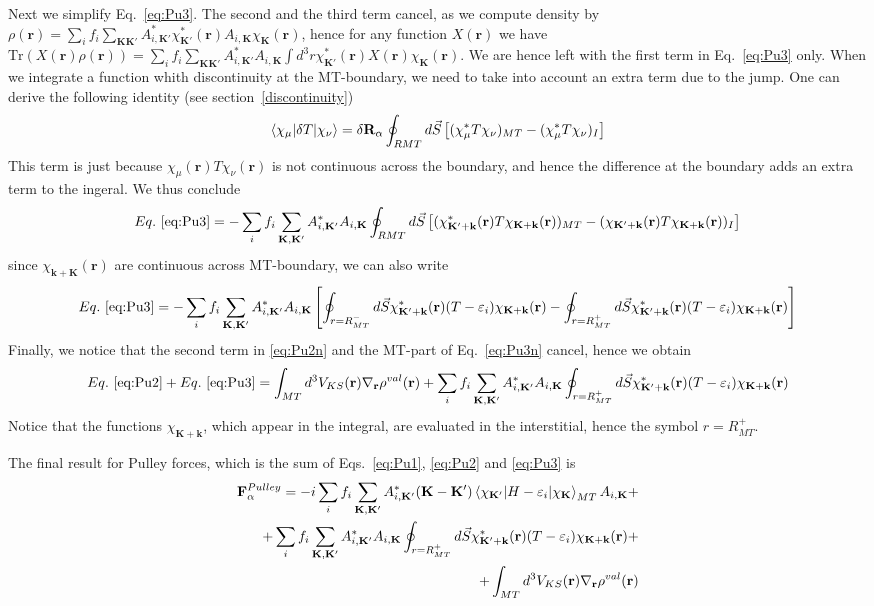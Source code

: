 \documentclass[aps,prb,floatfix,epsfig,singlecolumn,showpacs,preprintnumbers]{revtex4}
\newcommand{\vR}{{\mathbf{R}}}
\newcommand{\vF}{{\mathbf{F}}}
\renewcommand{\vr}{{\mathbf{r}}}
\newcommand{\vk}{{\mathbf{k}}}
\newcommand{\vK}{{\mathbf{K}}}
\newcommand{\Tr}{\mathrm{Tr}}
\begin{document}
Next we simplify Eq.~\ref{eq:Pu3}. The second and the third term
cancel, as we compute density by
$\rho(\vr)=\sum_i f_i \sum_{\vK\vK'}A_{i,\vK'}^* \chi^*_{\vK'}(\vr)
A_{i,\vK} \chi_{\vK}(\vr)$, hence for any function $X(\vr)$ we have
$\Tr(X(\vr)\rho(\vr))=\sum_i f_i \sum_{\vK\vK'}A_{i,\vK'}^* A_{i,\vK}
\int d^3r \chi^*_{\vK'}(\vr) X(\vr)\chi_{\vK}(\vr) $.
%
We are hence left with the first term in Eq.~\ref{eq:Pu3} only.
When we integrate a function whith discontinuity at the
MT-boundary, we need to take into account an extra term due to the
jump. One can derive the following identity (see section~\ref{discontinuity})
\begin{eqnarray}
\braket{\chi_\mu|\delta T|\chi_\nu}=\delta\vR_\alpha \oint_{RMT}
  d\vec{S}\left[ (\chi_\mu^* T \chi_\nu)_{MT} -(\chi_\mu^* T \chi_\nu)_I \right]
\end{eqnarray}
This term is just because $\chi_\mu(\vr)T\chi_\nu(\vr)$ is not continuous across the boundary,
and hence the difference at the boundary adds an extra term to the
ingeral. We thus conclude
\begin{eqnarray}
Eq.~\ref{eq:Pu3}=-\sum_i f_i \sum_{\vK,\vK'} A_{i,\vK'}^*A_{i,\vK}   
\oint_{RMT}d\vec{S} 
\left[
(\chi^*_{\vK'+\vk}(\vr) T  \chi_{\vK+\vk}(\vr))_{MT}-
(\chi_{\vK'+\vk}(\vr) T  \chi_{\vK+\vk}(\vr))_I
 \right]
\end{eqnarray}
since $\chi_{\vk+\vK}(\vr)$ are continuous across MT-boundary, we can
also write
\begin{eqnarray}
Eq.~\ref{eq:Pu3}=-\sum_i f_i \sum_{\vK,\vK'} A_{i,\vK'}^*A_{i,\vK}  
\left[ 
\oint_{r=R_{MT}^-}d\vec{S} 
\chi^*_{\vK'+\vk}(\vr)(T-\varepsilon_i) \chi_{\vK+\vk}(\vr)
-\oint_{r=R_{MT}^+}d\vec{S}
\chi^*_{\vK'+\vk}(\vr)(T-\varepsilon_i) \chi_{\vK+\vk}(\vr)
 \right]
\label{eq:Pu3n}
\end{eqnarray}
Finally, we notice that the second term in \ref{eq:Pu2n} and the
MT-part of Eq.~\ref{eq:Pu3n} cancel, hence we obtain
\begin{eqnarray}
Eq.~\ref{eq:Pu2} + Eq.~\ref{eq:Pu3}=
\int_{MT} d^3 V_{KS}(\vr) \nabla_\vr \rho^{val}(\vr)+
\sum_i f_i \sum_{\vK,\vK'} A_{i,\vK'}^*A_{i,\vK}   
\oint_{r=R_{MT}^+}d\vec{S} 
\chi^*_{\vK'+\vk}(\vr)(T-\varepsilon_i)\chi_{\vK+\vk}(\vr)
\label{eq:Pu4}
\end{eqnarray}
Notice that the functions $\chi_{\vK+\vk}$, which appear in the integral, are evaluated
in the interstitial, hence the symbol $r=R_{MT}^+$.

The final result for Pulley forces, which is the sum of
Eqs.~\ref{eq:Pu1}, \ref{eq:Pu2} and \ref{eq:Pu3} is 
\begin{eqnarray}
\vF^{Pulley}_\alpha = 
-i\sum_i f_i \sum_{\vK,\vK'} A_{i,\vK'}^* 
(\vK-\vK')\braket{ \chi_{\vK'}  |H-\varepsilon_i|\chi_{\vK}}_{MT}A_{i,\vK}+
\label{eq:Pul1}\\
+
\sum_i f_i \sum_{\vK,\vK'} A_{i,\vK'}^*A_{i,\vK}   
\oint_{r=R_{MT}^+}d\vec{S} 
\chi^*_{\vK'+\vk}(\vr)(T-\varepsilon_i) \chi_{\vK+\vk}(\vr)+
\label{eq:Pul2}\\
+\int_{MT} d^3 V_{KS}(\vr) \nabla_\vr \rho^{val}(\vr)
\label{eq:Pul3}
\end{eqnarray}
\end{document}
